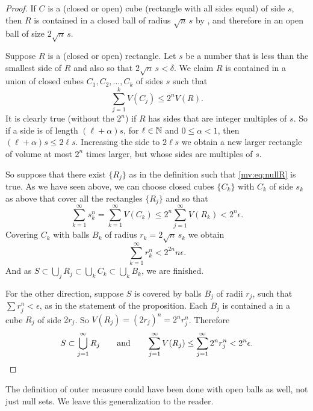 \begin{proof}
If $C$ is a (closed or open) cube (rectangle with all sides
equal) of side $s$, then $R$ is contained in a closed ball of radius
$\sqrt{n}\, s$ by , and therefore
in an open ball of size $2 \sqrt{n}\, s$.

Suppose $R$ is a (closed or open) rectangle.
Let $s$ be a number that is less than the smallest side of $R$ and also
so that $2\sqrt{n} \, s < \delta$.
We claim $R$ is contained in
a union of closed cubes $C_1, C_2, \ldots, C_k$ of sides $s$ such that
\begin{equation*}
\sum_{j=1}^k V(C_j) \leq 2^n V(R) .
\end{equation*}
It is clearly true (without the $2^n$) if $R$ has sides that are
integer multiples of $s$.  So if a side is of length $(\ell+\alpha) s$, for
$\ell \in {\mathbb{N}}$ and $0 \leq \alpha < 1$, then
$(\ell+\alpha)s \leq 2\ell s$.  Increasing the side to $2\ell s$ we obtain a new larger
rectangle of volume at most $2^n$ times larger, but whose sides are
multiples of $s$.

So suppose that there exist $\{ R_j \}$ as in the definition such that
\eqref{mv:eq:nullR} is true.  As we have seen above, we can choose closed
cubes $\{ C_k \}$ with $C_k$ of side $s_k$ as above that cover all the rectangles $\{ R_j \}$
and so that
\begin{equation*}
\sum_{k=1}^\infty s_k^n =
\sum_{k=1}^\infty V(C_k) \leq
2^n \sum_{j=1}^\infty V(R_k)
< 2^n \epsilon.
\end{equation*}
Covering $C_k$ with balls $B_k$ of radius $r_k = 2\sqrt{n} \, s_k$ we obtain 
\begin{equation*}
\sum_{k=1}^\infty r_k^n <
2^{2n} n \epsilon .
\end{equation*}
And as $S \subset\bigcup_{j} R_j \subset \bigcup_{k} C_k \subset \bigcup_{k}
B_k$, we are finished.

For the other direction, suppose $S$ is covered by balls $B_j$
of radii $r_j$, such that $\sum r_j^n < \epsilon$,
as in the statement of the proposition.
Each $B_j$ is contained a in a cube $R_j$ of side $2r_j$.
So $V(R_j) = {(2 r_j)}^n = 2^n r_j^n$.  Therefore 
\begin{equation*}
S \subset \bigcup_{j=1}^\infty R_j \qquad \text{and} \qquad
\sum_{j=1}^\infty V(R_j)
\leq
\sum_{j=1}^\infty 2^n r_j^n < 2^n \epsilon. \qedhere
\end{equation*}
\end{proof}

The definition of outer measure could have been done with open balls
as well, not just null sets.  We leave this generalization to the reader.

